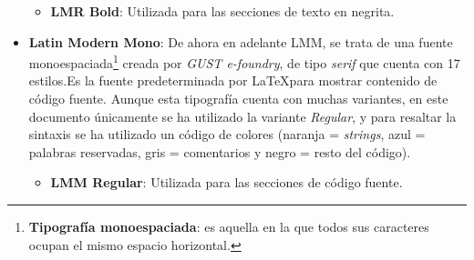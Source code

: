 \documentclass[../ei103948-project-documentation.tex]{subfiles}
\begin{document}
\begin{itemize}
\begin{itemize}
                                            \newpage
                    
                                            \item \textbf{LMR Bold}: Utilizada para las secciones de texto en negrita.
                                            \begin{figure}[H]
                                                \begin{center}
                                                \end{center}
                                            \end{figure}
                                        \end{itemize}
                                    \item \textbf{Latin Modern Mono}: De ahora en adelante LMM, se trata de una fuente monoespaciada\footnote{\textbf{Tipografía monoespaciada}: es aquella en la que todos sus caracteres ocupan el mismo espacio horizontal.} creada por \textit{GUST e-foundry}, de tipo \textit{serif} que cuenta con 17 estilos.Es la fuente predeterminada por \LaTeX para mostrar contenido de código fuente. Aunque esta tipografía cuenta con muchas variantes, en este documento únicamente se ha utilizado la variante \textit{Regular}, y para resaltar la sintaxis se ha utilizado un código de colores (naranja = \textit{strings}, azul = palabras reservadas, gris = comentarios y negro = resto del código).
                                        \begin{itemize}
                                            \item \textbf{LMM Regular}: Utilizada para las secciones de código fuente.
                                            \begin{figure}[H]
                                                \begin{center}
                                                \end{center}
                                            \end{figure}
                                        \end{itemize}                
                                \end{itemize}
\end{document}
